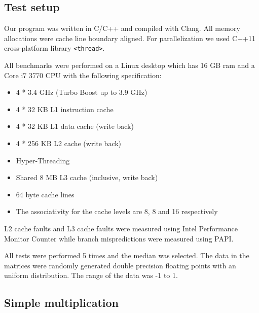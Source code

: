 \subsection{Test setup}

Our program was written in C/C++ and compiled with Clang. All memory allocations were cache line boundary aligned. For parallelization we used C++11 cross-platform library \texttt{<thread>}.

All benchmarks were performed on a Linux desktop which has 16 GB ram and a Core i7 3770 CPU with the following specification:

\begin{itemize}
\item 4 * 3.4 GHz (Turbo Boost up to 3.9 GHz)
\item 4 * 32 KB L1 instruction cache
\item 4 * 32 KB L1 data cache (write back)
\item 4 * 256 KB L2 cache (write back)
\item Hyper-Threading
\item Shared 8 MB L3 cache (inclusive, write back)
\item 64 byte cache lines
\item The associativity for the cache levels are 8, 8 and 16 respectively
\end{itemize}

L2 cache faults and L3 cache faults were measured using Intel Performance Monitor Counter while branch mispredictions were measured using PAPI.

All tests were performed 5 times and the median was selected. The data in the matrices were randomly generated double precision floating points with
an uniform distribution. The range of the data was -1 to
1.

\subsection{Simple multiplication}

